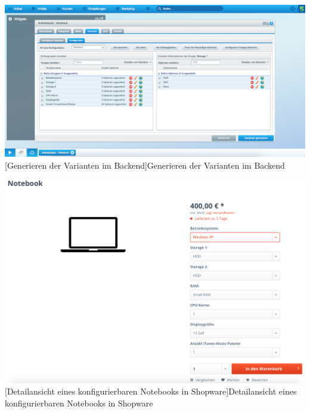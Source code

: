 \begin{appendix}
\vspace{1em}
\begin{minipage}{\linewidth}
	\centering
	\includegraphics[width=1\linewidth]{Abbildungen/shopwareBackendArtikelVarianten.png}
	[Generieren der Varianten im Backend]{Generieren der Varianten im Backend}
	\label{app:shopwareBackendArtikelVarianten}
\end{minipage}
\vspace{1em}

\vspace{1em}
\begin{minipage}{\linewidth}
	\centering
	\includegraphics[width=1\linewidth]{Abbildungen/shopwareNotebookDetail.png}
	[Detailansicht eines konfigurierbaren Notebooks in Shopware]{Detailansicht eines konfigurierbaren Notebooks in Shopware}
	\label{app:shopwareNotebookDetail}
\end{minipage}
\vspace{1em}


\end{appendix}
